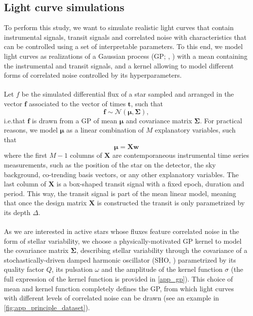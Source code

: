 \documentclass[modern,linenumbers]{aastex631}
\begin{document}
\subsection{Light curve simulations}\label{light_curves_simulations}
To perform this study, we want to simulate realistic light curves that contain instrumental signals, transit signals and correlated noise with characteristics that can be controlled using a set of interpretable parameters. To this end, we model light curves as realizations of a Gaussian process (GP; \citealt{Rasmussen2005}, \citealt{Aigrain2023}) with a mean containing the instrumental and transit signals, and a kernel allowing to model different forms of correlated noise controlled by its hyperparameters.\\\\
Let $f$ be the simulated differential flux of a star sampled and arranged in the vector $\bm{f}$ associated to the vector of times $\bm{t}$, such that
\begin{equation*}
    \bm{f} \sim \mathcal{N}(\bm{\mu}, \bm{\Sigma}),
\end{equation*}
i.e.\;that $\bm{f}$ is drawn from a GP of mean $\bm{\mu}$ and covariance matrix $\bm{\Sigma}$. For practical reasons, we model $\bm{\mu}$ as a linear combination of $M$ explanatory variables, such that
\begin{equation}\label{eq:linear_model}
    \bm{\mu} = \bm{X w}
\end{equation}
where the first $M-1$ columns of $\bm{X}$ are contemporaneous instrumental time series measurements, such as the position of the star on the detector, the sky background, co-trending basis vectors, or any other explanatory variables. The last column of $\bm{X}$ is a box-shaped transit signal with a fixed epoch, duration and period. This way, the transit signal is part of the mean linear model, meaning that once the design matrix $\bm{X}$ is constructed the transit is only parametrized by its depth $\Delta$.\\\\
As we are interested in active stars whose fluxes feature correlated noise in the form of stellar variability, we choose a physically-motivated GP kernel to model the covariance matrix $\bm{\Sigma}$, describing stellar variability through the covariance of a stochastically-driven damped harmonic oscillator (SHO, \citealt{celerite, celerite2}) parametrized by its quality factor $Q$, its pulsation $\omega$ and the amplitude of the kernel function $\sigma$ (the full expression of the kernel function is provided in \autoref{app_gp}). This choice of mean and kernel function completely defines the GP, from which light curves with different levels of correlated noise can be drawn (see an example in \autoref{fig:app_principle_dataset}).
\end{document}
